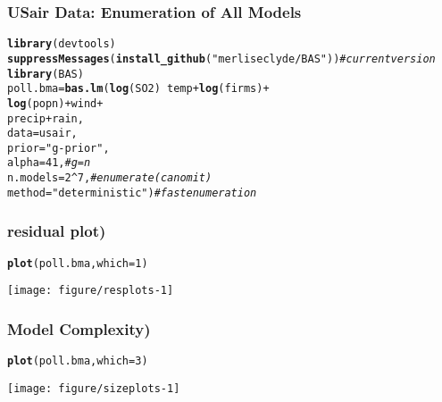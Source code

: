 \documentclass[handout]{beamer}\usepackage[]{graphicx}\usepackage[]{color}
\makeatletter
\def\maxwidth{ %
  \ifdim\Gin@nat@width>\linewidth
    \linewidth
  \else
    \Gin@nat@width
  \fi
}
\newcommand{\hlnum}[1]{\textcolor[rgb]{0.686,0.059,0.569}{#1}}%
\newcommand{\hlstr}[1]{\textcolor[rgb]{0.192,0.494,0.8}{#1}}%
\newcommand{\hlcom}[1]{\textcolor[rgb]{0.678,0.584,0.686}{\textit{#1}}}%
\newcommand{\hlopt}[1]{\textcolor[rgb]{0,0,0}{#1}}%
\newcommand{\hlstd}[1]{\textcolor[rgb]{0.345,0.345,0.345}{#1}}%
\newcommand{\hlkwb}[1]{\textcolor[rgb]{0.69,0.353,0.396}{#1}}%
\newcommand{\hlkwc}[1]{\textcolor[rgb]{0.333,0.667,0.333}{#1}}%
\newcommand{\hlkwd}[1]{\textcolor[rgb]{0.737,0.353,0.396}{\textbf{#1}}}%
\newenvironment{kframe}{%
 \def\at@end@of@kframe{}%
 \ifinner\ifhmode%
  \def\at@end@of@kframe{\end{minipage}}%
  \begin{minipage}{\columnwidth}%
 \fi\fi%
 \def\FrameCommand##1{\hskip\@totalleftmargin \hskip-\fboxsep
 \colorbox{shadecolor}{##1}\hskip-\fboxsep
     \hskip-\linewidth \hskip-\@totalleftmargin \hskip\columnwidth}%
 \MakeFramed {\advance\hsize-\width
   \@totalleftmargin\z@ \linewidth\hsize
   \@setminipage}}%
 {\par\unskip\endMakeFramed%
 \at@end@of@kframe}
\newenvironment{knitrout}{}{} %
\makeatother
\begin{document}
\begin{frame}[fragile] \frametitle{USair Data: Enumeration of All Models}
\begin{knitrout}
\color{fgcolor}\begin{kframe}
\begin{alltt}
\hlkwd{library}\hlstd{(devtools)}
\hlkwd{suppressMessages}\hlstd{(}\hlkwd{install_github}\hlstd{(}\hlstr{"merliseclyde/BAS"}\hlstd{))}  \hlcom{# current version}
\hlkwd{library}\hlstd{(BAS)}
\hlstd{poll.bma} \hlkwb{=} \hlkwd{bas.lm}\hlstd{(}\hlkwd{log}\hlstd{(SO2)} \hlopt{~} \hlstd{temp} \hlopt{+} \hlkwd{log}\hlstd{(firms)} \hlopt{+}
                             \hlkwd{log}\hlstd{(popn)} \hlopt{+} \hlstd{wind} \hlopt{+}
                             \hlstd{precip}\hlopt{+} \hlstd{rain,}
                  \hlkwc{data}\hlstd{=usair,}
                  \hlkwc{prior}\hlstd{=}\hlstr{"g-prior"}\hlstd{,}
                  \hlkwc{alpha}\hlstd{=}\hlnum{41}\hlstd{,}    \hlcom{# g = n}
                  \hlkwc{n.models}\hlstd{=}\hlnum{2}\hlopt{^}\hlnum{7}\hlstd{,}\hlcom{# enumerate (can omit)}
                  \hlkwc{method}\hlstd{=}\hlstr{"deterministic"}\hlstd{)}   \hlcom{# fast enumeration}
\end{alltt}
\end{kframe}
\end{knitrout}

\end{frame}

\begin{frame}\frametitle{residual plot)}
\begin{knitrout}
\color{fgcolor}\begin{kframe}
\begin{alltt}
\hlkwd{plot}\hlstd{(poll.bma,} \hlkwc{which}\hlstd{=}\hlnum{1}\hlstd{)}
\end{alltt}
\end{kframe}

{\centering \texttt{[image: figure/resplots-1]} 

}



\end{knitrout}
\end{frame}

\begin{frame}\frametitle{Model Complexity)}
\begin{knitrout}
\color{fgcolor}\begin{kframe}
\begin{alltt}
\hlkwd{plot}\hlstd{(poll.bma,} \hlkwc{which}\hlstd{=}\hlnum{3}\hlstd{)}
\end{alltt}
\end{kframe}

{\centering \texttt{[image: figure/sizeplots-1]} 

}



\end{knitrout}
\end{frame}
\end{document}
